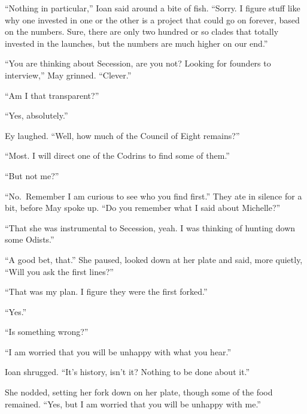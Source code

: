 ``Nothing in particular,'' Ioan said around a bite of fish. ``Sorry. I figure stuff like why one invested in one or the other is a project that could go on forever, based on the numbers. Sure, there are only two hundred or so clades that totally invested in the launches, but the numbers are much higher on our end.''

``You are thinking about Secession, are you not? Looking for founders to interview,'' May grinned. ``Clever.''

``Am I that transparent?''

``Yes, absolutely.''

Ey laughed. ``Well, how much of the Council of Eight remains?''

``Most. I will direct one of the Codrins to find some of them.''

``But not me?''

``No.~Remember I am curious to see who you find first.'' They ate in silence for a bit, before May spoke up. ``Do you remember what I said about Michelle?''

``That she was instrumental to Secession, yeah. I was thinking of hunting down some Odists.''

``A good bet, that.'' She paused, looked down at her plate and said, more quietly, ``Will you ask the first lines?''

``That was my plan. I figure they were the first forked.''

``Yes.''

``Is something wrong?''

``I am worried that you will be unhappy with what you hear.''

Ioan shrugged. ``It's history, isn't it? Nothing to be done about it.''

She nodded, setting her fork down on her plate, though some of the food remained. ``Yes, but I am worried that you will be unhappy with me.''
